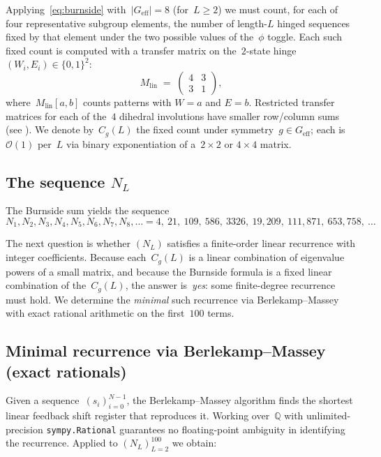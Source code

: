 \documentclass[11pt,a4paper]{article}
\theoremstyle{definition}
\theoremstyle{plain}
\newcommand{\Q}{\mathbb{Q}}
\newcommand{\bigo}{\mathcal{O}}
\begin{document}
Applying~\eqref{eq:burnside} with~$|G_{\text{eff}}| = 8$ (for~$L \ge 2$) we
must count, for each of four representative subgroup elements, the number
of length-$L$ hinged sequences fixed by that element under the two possible
values of the~$\phi$ toggle.  Each such fixed count is computed with a
transfer matrix on the~$2$-state hinge~$(W_i, E_i) \in \{0,1\}^2$:
\begin{equation}\label{eq:M_lin}
M_{\text{lin}} \;=\; \begin{pmatrix} 4 & 3 \\ 3 & 1 \end{pmatrix},
\end{equation}
where~$M_{\text{lin}}[a,b]$ counts patterns with $W = a$ and $E = b$.
Restricted transfer matrices for each of the~$4$ dihedral involutions have
smaller row/column sums (see \cite{snake-src}).  We denote by~$C_g(L)$ the
fixed count under symmetry~$g \in G_{\text{eff}}$; each is $\bigo(1)$ per~$L$
via binary exponentiation of a~$2\times 2$ or $4\times 4$ matrix.

\subsection{The sequence $N_L$}

The Burnside sum yields the sequence
\begin{equation}\label{eq:N-firstvalues}
N_1, N_2, N_3, N_4, N_5, N_6, N_7, N_8, \dots
= 4,\ 21,\ 109,\ 586,\ 3326,\ 19{,}209,\ 111{,}871,\ 653{,}758,\ \dots
\end{equation}

The next question is whether $(N_L)$ satisfies a finite-order linear
recurrence with integer coefficients.  Because each~$C_g(L)$ is a linear
combination of eigenvalue powers of a small matrix, and because the
Burnside formula is a fixed linear combination of the~$C_g(L)$, the answer
is~\emph{yes}: some finite-degree recurrence must hold.  We determine the
\emph{minimal} such recurrence via Berlekamp--Massey with exact rational
arithmetic on the first~$100$ terms.

\subsection{Minimal recurrence via Berlekamp--Massey (exact rationals)}
\label{sec:snake-BM}

Given a sequence~$(s_i)_{i=0}^{N-1}$, the Berlekamp--Massey algorithm
finds the shortest linear feedback shift register that reproduces it.
Working over~$\Q$ with unlimited-precision \texttt{sympy.Rational}
guarantees no floating-point ambiguity in identifying the recurrence.
Applied to $(N_L)_{L=2}^{100}$ we obtain:
\end{document}
